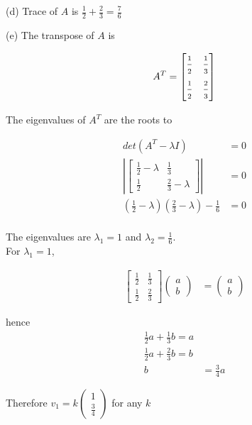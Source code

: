 \documentclass[a4paper, 10pt]{article}
\begin{document}
(d) Trace of $A$ is $ \frac{1}{2} + \frac{2}{3} = \frac{7}{6} $

(e) The transpose of $A$ is 

\[
  A^T = \begin{bmatrix} 
   \frac{\strut 1}{\strut 2} & \frac{\strut 1}{\strut 3}   \\ 
   \frac{\strut 1}{\strut 2} & \frac{\strut 2}{\strut 3}
\end{bmatrix}
\] 

The eigenvalues of $A^T$ are the roots to

\begin{align*}
   det \left( A^T - \lambda I \right)  &= 0 \\
   \left| \begin{bmatrix} 
      \frac{1}{2} - \lambda & \frac{1}{3} \\ \frac{1}{2} & \frac{2}{3} - \lambda  
   \end{bmatrix}
   \right|  &= 0 \\
   \left( \frac{1}{2} - \lambda \right) \left( \frac{2}{3} - \lambda \right) - \frac{1}{6} &= 0 \\
\end{align*}

The eigenvalues are $\lambda_1 = 1$ and $\lambda_2 = \frac{1}{6}$. \\

For $\lambda_1 = 1$, 

\begin{align*}
   \begin{bmatrix} 
      \frac{1}{2} & \frac{1}{3} \\ \frac{1}{2} & \frac{2}{3}    
      \end{bmatrix} \begin{pmatrix} a \\b \end{pmatrix}  &= \begin{pmatrix} a \\ b \end{pmatrix} 
\end{align*}

hence
\begin{align*}
      \frac{1}{2} a + \frac{1}{3}b = a \\
      \frac{1}{2} a + \frac{2}{3} b = b \\
      b &= \frac{3}{4}a 
\end{align*}

Therefore $v_1 = k \begin{pmatrix} 1 \\ \frac{3}{4} \end{pmatrix} $ for any $k$ \\
\end{document}
